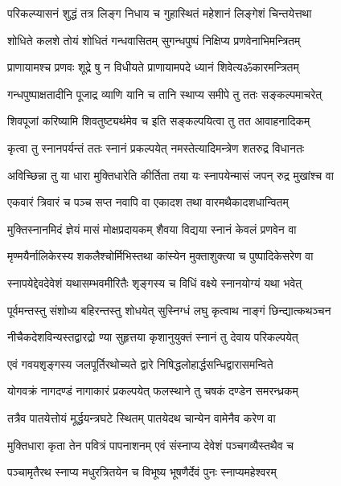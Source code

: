 \twolineshloka
{परिकल्प्यासनं शुद्धं तत्र लिङ्ग निधाय च}
{गुहास्थितं महेशानं लिङ्गेशं चिन्तयेत्तथा}%

\twolineshloka
{शोधिते कलशे तोयं शोधितं गन्धवासितम्}
{सुगन्धपुष्पं निक्षिप्य प्रणवेनाभिमन्त्रितम्}%

\twolineshloka
{प्राणायामश्च प्रणवः शूद्रे षु न विधीयते}
{प्राणायामपदे ध्यानं शिवेत्यॐकारमन्त्रितम्}%

\twolineshloka
{गन्धपुष्पाक्षतादीनि पूजाद्र व्याणि यानि च}
{तानि स्थाप्य समीपे तु ततः सङ्कल्पमाचरेत्}%

\twolineshloka
{शिवपूजां करिष्यामि शिवतुष्ट्यर्थमेव च}
{इति सङ्कल्पयित्वा तु तत आवाहनादिकम्}%

\twolineshloka
{कृत्वा तु स्नानपर्यन्तं ततः स्नानं प्रकल्पयेत्}
{नमस्तेत्यादिमन्त्रेण शतरुद्र विधानतः}%

\twolineshloka
{अविच्छिन्ना तु या धारा मुक्तिधारेति कीर्तिता}
{तया यः स्नापयेन्मासं जपन् रुद्र मुखांश्च वा}%

\twolineshloka
{एकवारं त्रिवारं च पञ्च सप्त नवापि वा}
{एकादश तथा वारमथैकादशधान्वितम्}%

\twolineshloka
{मुक्तिस्नानमिदं ज्ञेयं मासं मोक्षप्रदायकम्}
{शैवया विद्यया स्नानं केवलं प्रणवेन वा}%

\twolineshloka
{मृण्मयैर्नालिकेरस्य शकलैश्चोर्मिभिस्तथा}
{कांस्येन मुक्ताशुक्त्या च पुष्पादिकेसरेण वा}%

\twolineshloka
{स्नापयेद्देवदेवेशं यथासम्भवमीरितैः}
{शृङ्गस्य च विधिं वक्ष्ये स्नानयोग्यं यथा भवेत्}%

\twolineshloka
{पूर्वमन्तस्तु संशोध्य बहिरन्तस्तु शोधयेत्}
{सुस्निग्धं लघु कृत्वाथ नाङ्गं छिन्द्यात्कथञ्चन}%

\twolineshloka
{नीचैकदेशविन्यस्तद्वारद्रो ण्या सुहृत्तया}
{कृशानुयुक्तं स्नानं तु देवाय परिकल्पयेत्}%

\twolineshloka
{एवं गवयशृङ्गस्य जलपूर्तिरथोच्यते}
{द्वारे निषिद्धलोहार्द्धसन्धिद्वारासमन्विते}%

\twolineshloka
{योगवक्रं नागदण्डं नागाकारं प्रकल्पयेत्}
{फलस्थाने तु चषकं दण्डेन समरन्ध्रकम्}%

\twolineshloka
{तत्रैव पातयेत्तोयं मूर्द्धयन्त्रघटे स्थितम्}
{पातयेदथ चान्येन वामेनैव करेण वा}%

\twolineshloka
{मुक्तिधारा कृता तेन पवित्रं पापनाशनम्}
{एवं संस्नाप्य देवेशं पञ्चगव्यैस्तथैव च}%

\twolineshloka
{पञ्चामृतैरथ स्नाप्य मधुरत्रितयेन च}
{विभूष्य भूषणैर्देवं पुनः स्नाप्यमहेश्वरम्}%

